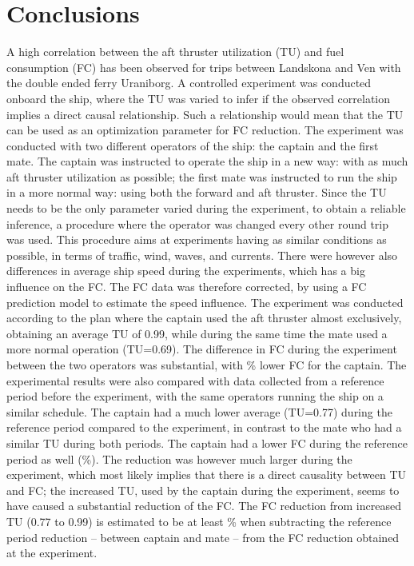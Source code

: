 \section{Conclusions}
A high correlation between the aft thruster utilization (TU) and fuel consumption (FC) has been observed for trips between Landskona and Ven with the double ended ferry Uraniborg.  A controlled experiment was conducted onboard the ship, where the TU was varied to infer if the observed correlation implies a direct causal relationship. Such a relationship would mean that the TU can be used as an optimization parameter for FC reduction.
The experiment was conducted with two different operators of the ship: the captain and the first mate. The captain was instructed to operate the ship in a new way: with as much aft thruster utilization as possible; the first mate was instructed to run the ship in a more normal way: using both the forward and aft thruster.
Since the TU needs to be the only parameter varied during the experiment, to obtain a reliable inference, a procedure where the operator was changed every other round trip was used. This procedure aims at experiments having as similar conditions as possible, in terms of traffic, wind, waves, and currents.
There were however also differences in average ship speed during the experiments, which has a big influence on the FC. The FC data was therefore corrected, by using a FC prediction model to estimate the speed influence.
The experiment was conducted according to the plan where the captain used the aft thruster almost exclusively, obtaining an average TU of 0.99, while during the same time the mate used a more normal operation (TU=0.69). The difference in FC during the experiment between the two operators was substantial, with \savingpctexperiment \% lower FC for the captain. 
The experimental results were also compared with data collected from a reference period before the experiment, with the same operators running the ship on a similar schedule. The captain had a much lower average (TU=0.77) during the reference period compared to the experiment, in contrast to the mate who had a similar TU during both periods. The captain had a lower FC during the reference period as well (\savingpctbeforeexperiment \%).
The reduction was however much larger during the experiment, which most likely implies that there is a direct causality between TU and FC; the increased TU, used by the captain during the experiment, seems to have caused a substantial reduction of the FC. The FC reduction from increased TU (0.77 to 0.99) is estimated to be at least \savingthrusterallocationpct \% when subtracting the reference period reduction -- between captain and mate -- from the FC reduction obtained at the experiment. 

